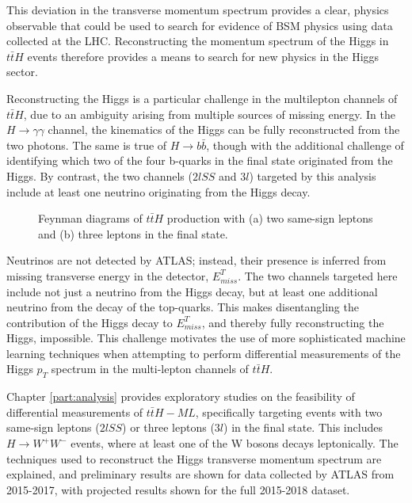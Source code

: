 This deviation in the transverse momentum spectrum provides a clear, physics observable that could be used to search for evidence of BSM physics using data collected at the LHC. Reconstructing the momentum spectrum of the Higgs in $t\bar{t}H$ events therefore provides a means to search for new physics in the Higgs sector.

Reconstructing the Higgs is a particular challenge in the multilepton channels of $t\bar{t}H$, due to an ambiguity arising from multiple sources of missing energy. In the $H\rightarrow \gamma\gamma$ channel, the kinematics of the Higgs can be fully reconstructed from the two photons. The same is true of $H\rightarrow b\bar{b}$, though with the additional challenge of identifying which two of the four b-quarks in the final state originated from the Higgs. By contrast, the two channels ($2lSS$ and $3l$) targeted by this analysis include at least one neutrino originating from the Higgs decay. 

\begin{figure}[H]
    \centering
    \caption{Feynman diagrams of $t\bar{t}H$ production with (a) two same-sign leptons and (b) three leptons in the final state.}
    \label{fig:ttH-2lSS-3l}
\end{figure}

Neutrinos are not detected by ATLAS; instead, their presence is inferred from missing transverse energy in the detector, $E^T_{miss}$. The two channels targeted here include not just a neutrino from the Higgs decay, but at least one additional neutrino from the decay of the top-quarks. This makes disentangling the contribution of the Higgs decay to $E^T_{miss}$, and thereby fully reconstructing the Higgs, impossible. This challenge motivates the use of more sophisticated machine learning techniques when attempting to perform differential measurements of the Higgs $p_T$ spectrum in the multi-lepton channels of $t\bar{t}H$. 

Chapter \ref{part:analysis} provides exploratory studies on the feasibility of differential measurements of $t\bar{t}H-ML$, specifically targeting events with two same-sign leptons ($2lSS$) or three leptons ($3l$) in the final state. This includes $H \rightarrow W^+W^-$ events, where at least one of the W bosons decays leptonically. The techniques used to reconstruct the Higgs transverse momentum spectrum are explained, and preliminary results are shown for data collected by ATLAS from 2015-2017, with projected results shown for the full 2015-2018 dataset.


